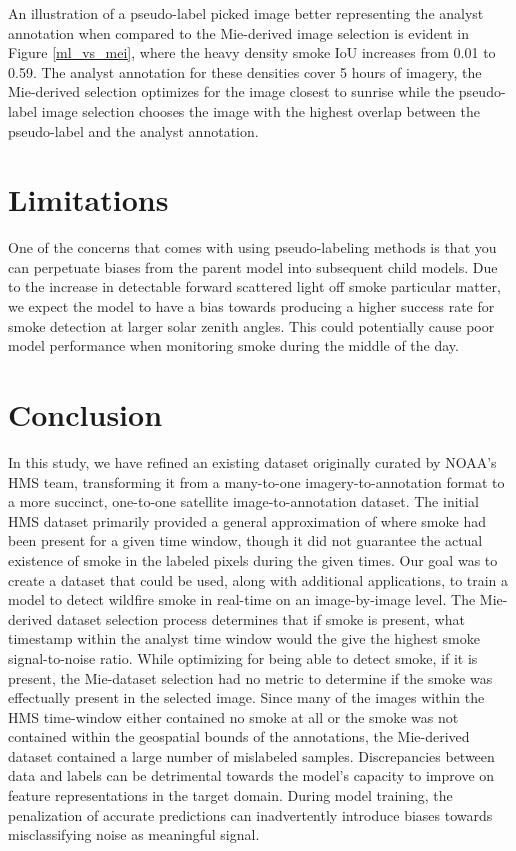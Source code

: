\documentclass{article}
\begin{document}
An illustration of a pseudo-label picked image better representing the analyst annotation when compared to the Mie-derived image selection is evident in Figure \ref{ml_vs_mei}, where the heavy density smoke IoU increases from 0.01 to 0.59. The analyst annotation for these densities cover 5 hours of imagery, the Mie-derived selection optimizes for the image closest to sunrise while the pseudo-label image selection chooses the image with the highest overlap between the pseudo-label and the analyst annotation. 

\section{Limitations}

One of the concerns that comes with using pseudo-labeling methods is that you can perpetuate biases from the parent model into subsequent child models. Due to the increase in detectable forward scattered light off smoke particular matter, we expect the model to have a bias towards producing a higher success rate for smoke detection at larger solar zenith angles. This could potentially cause poor model performance when monitoring smoke during the middle of the day.

\section{Conclusion}

In this study, we have refined an existing dataset originally curated by NOAA's HMS team, transforming it from a many-to-one imagery-to-annotation format to a more succinct, one-to-one satellite image-to-annotation dataset. The initial HMS dataset primarily provided a general approximation of where smoke had been present for a given time window, though it did not guarantee the actual existence of smoke in the labeled pixels during the given times. Our goal was to create a dataset that could be used, along with additional applications, to train a model to detect wildfire smoke in real-time on an image-by-image level. The Mie-derived dataset selection process determines that if smoke is present, what timestamp within the analyst time window would the give the highest smoke signal-to-noise ratio. While optimizing for being able to detect smoke, if it is present, the Mie-dataset selection had no metric to determine if the smoke was effectually present in the selected image. Since many of the images within the HMS time-window either contained no smoke at all or the smoke was not contained within the geospatial bounds of the annotations, the Mie-derived dataset contained a large number of mislabeled samples. Discrepancies between data and labels can be detrimental towards the model's capacity to improve on feature representations in the target domain. During model training, the penalization of accurate predictions can inadvertently introduce biases towards misclassifying noise as meaningful signal. 
\end{document}
